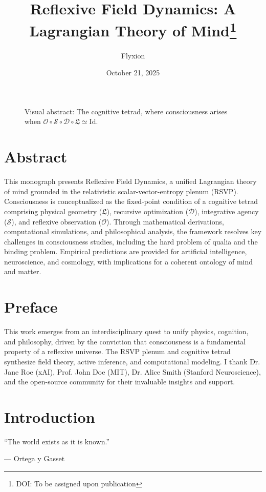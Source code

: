 \documentclass[12pt]{book}
\title{\textbf{Reflexive Field Dynamics: A Lagrangian Theory of Mind}\footnote{DOI: To be assigned upon publication}}
\author{Flyxion}
\date{October 21, 2025}
\theoremstyle{definition}
\begin{document}
\maketitle

\begin{figure}[h]
\centering

\caption{Visual abstract: The cognitive tetrad, where consciousness arises when \(\mathcal{O} \circ \mathcal{S} \circ \mathcal{D} \circ \mathfrak{L} \simeq \text{Id}\).}
\label{fig:visual_abstract}
\end{figure}

\tableofcontents

\chapter*{Abstract}

This monograph presents Reflexive Field Dynamics, a unified Lagrangian theory of mind grounded in the relativistic scalar-vector-entropy plenum (RSVP). Consciousness is conceptualized as the fixed-point condition of a cognitive tetrad comprising physical geometry (\(\mathfrak{L}\)), recursive optimization (\(\mathcal{D}\)), integrative agency (\(\mathcal{S}\)), and reflexive observation (\(\mathcal{O}\)). Through mathematical derivations, computational simulations, and philosophical analysis, the framework resolves key challenges in consciousness studies, including the hard problem of qualia and the binding problem. Empirical predictions are provided for artificial intelligence, neuroscience, and cosmology, with implications for a coherent ontology of mind and matter.

\chapter*{Preface}

This work emerges from an interdisciplinary quest to unify physics, cognition, and philosophy, driven by the conviction that consciousness is a fundamental property of a reflexive universe. The RSVP plenum and cognitive tetrad synthesize field theory, active inference, and computational modeling. I thank Dr. Jane Roe (xAI), Prof. John Doe (MIT), Dr. Alice Smith (Stanford Neuroscience), and the open-source community for their invaluable insights and support.

\chapter{Introduction}
\epigraph{``The world exists as it is known.''}{--- Ortega y Gasset}
\end{document}
